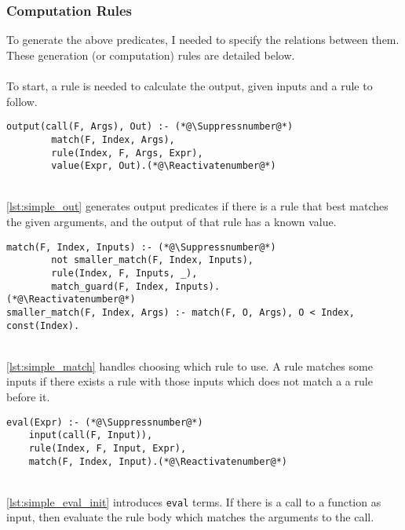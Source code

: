 
\subsubsection{Computation Rules}
To generate the above predicates, I needed to specify the relations between them. These generation (or computation) rules are detailed below. \\ \\
To start, a rule is needed to calculate the output, given inputs and a rule to follow. \\

\begin{lstlisting}[caption={Output generation}, label={lst:simple_out}, firstnumber=55]
output(call(F, Args), Out) :- (*@\Suppressnumber@*)
		match(F, Index, Args), 
		rule(Index, F, Args, Expr), 
		value(Expr, Out).(*@\Reactivatenumber@*)	
\end{lstlisting}
\mbox{} \\
\ref{lst:simple_out} generates output predicates if there is a rule that best matches the given arguments, and the output of that rule has a known value. \\

\begin{lstlisting}[caption={Match rules}, label={lst:simple_match}, firstnumber=123]
match(F, Index, Inputs) :- (*@\Suppressnumber@*)
		not smaller_match(F, Index, Inputs), 
		rule(Index, F, Inputs, _), 
		match_guard(F, Index, Inputs).
(*@\Reactivatenumber@*)	
smaller_match(F, Index, Args) :- match(F, O, Args), O < Index, const(Index).
\end{lstlisting}
\mbox{} \\
\ref{lst:simple_match} handles choosing which rule to use. A rule matches some inputs if there exists a rule with those inputs which does not match a a rule before it. \\

\begin{lstlisting}[caption={Eval introduction}, label={lst:simple_eval_init}, firstnumber=75]
eval(Expr) :- (*@\Suppressnumber@*)
	input(call(F, Input)), 
	rule(Index, F, Input, Expr), 
	match(F, Index, Input).(*@\Reactivatenumber@*)	
\end{lstlisting}
\mbox{}\\
\ref{lst:simple_eval_init} introduces \lstinline!eval! terms. If there is a call to a function as input, then evaluate the rule body which matches the arguments to the call. \\

